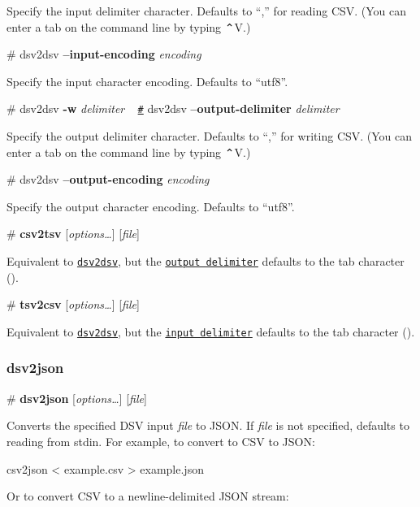 Specify the input delimiter character. Defaults to “,” for reading C\+SV. (You can enter a tab on the command line by typing ⌃V.)

\label{_dsv2dsv_input_encoding}%
\# dsv2dsv {\bfseries --input-\/encoding} {\itshape encoding}

Specify the input character encoding. Defaults to “utf8”.

\label{_dsv2dsv_output_delimiter}%
\# dsv2dsv {\bfseries -\/w} {\itshape delimiter} ~\newline
\href{dsv2dsv_output_delimiter}{\tt \#} dsv2dsv {\bfseries --output-\/delimiter} {\itshape delimiter}

Specify the output delimiter character. Defaults to “,” for writing C\+SV. (You can enter a tab on the command line by typing ⌃V.)

\label{_dsv2dsv_output_encoding}%
\# dsv2dsv {\bfseries --output-\/encoding} {\itshape encoding}

Specify the output character encoding. Defaults to “utf8”.

\label{_csv2tsv}%
\# {\bfseries csv2tsv} \mbox{[}{\itshape options…}\mbox{]} \mbox{[}{\itshape file}\mbox{]}

Equivalent to \href{#dsv2dsv}{\tt dsv2dsv}, but the \href{#dsv2dsv_output_delimiter}{\tt output delimiter} defaults to the tab character ().

\label{_tsv2csv}%
\# {\bfseries tsv2csv} \mbox{[}{\itshape options…}\mbox{]} \mbox{[}{\itshape file}\mbox{]}

Equivalent to \href{#dsv2dsv}{\tt dsv2dsv}, but the \href{#dsv2dsv_output_delimiter}{\tt input delimiter} defaults to the tab character ().

\subsubsection*{dsv2json}

\label{_dsv2json}%
\# {\bfseries dsv2json} \mbox{[}{\itshape options…}\mbox{]} \mbox{[}{\itshape file}\mbox{]}

Converts the specified D\+SV input {\itshape file} to J\+S\+ON. If {\itshape file} is not specified, defaults to reading from stdin. For example, to convert to C\+SV to J\+S\+ON\+:


\begin{DoxyCode}
csv2json < example.csv > example.json
\end{DoxyCode}


Or to convert C\+SV to a newline-\/delimited J\+S\+ON stream\+:


